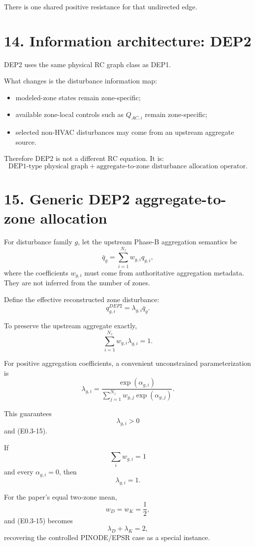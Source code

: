 \documentclass[11pt]{article}
\begin{document}
There is one shared positive resistance for that undirected edge.

\section*{14. Information architecture: DEP2}

DEP2 uses the same physical RC graph class as DEP1.

What changes is the disturbance information map:
\begin{itemize}
    \item modeled-zone states remain zone-specific;
    \item available zone-local controls such as $Q_{AC,i}$ remain zone-specific;
    \item selected non-HVAC disturbances may come from an upstream aggregate
          source.
\end{itemize}

Therefore DEP2 is not a different RC equation.  It is:
\[
\boxed{
\text{DEP1-type physical graph}
+
\text{aggregate-to-zone disturbance allocation operator}.
}
\]

\section*{15. Generic DEP2 aggregate-to-zone allocation}

For disturbance family $g$, let the upstream Phase-B aggregation semantics be
\[
\boxed{
\bar q_g
=
\sum_{i=1}^{N_z} w_{g,i} q_{g,i},
}
\tag{E0.3-13}
\]
where the coefficients $w_{g,i}$ must come from authoritative aggregation
metadata.  They are not inferred from the number of zones.

Define the effective reconstructed zone disturbance:
\[
\boxed{
q_{g,i}^{DEP2}
=
\lambda_{g,i}\bar q_g.
}
\tag{E0.3-14}
\]

To preserve the upstream aggregate exactly,
\[
\boxed{
\sum_{i=1}^{N_z}
w_{g,i}\lambda_{g,i}
=
1.
}
\tag{E0.3-15}
\]

For positive aggregation coefficients, a convenient unconstrained
parameterization is
\[
\boxed{
\lambda_{g,i}
=
\frac{\exp(\alpha_{g,i})}
{\sum_{j=1}^{N_z} w_{g,j}\exp(\alpha_{g,j})}.
}
\tag{E0.3-16}
\]

This guarantees
\[
\lambda_{g,i}>0
\]
and (E0.3-15).

If
\[
\sum_i w_{g,i}=1
\]
and every $\alpha_{g,i}=0$, then
\[
\lambda_{g,i}=1.
\]

For the paper's equal two-zone mean,
\[
w_D=w_K=\frac12,
\]
and (E0.3-15) becomes
\[
\lambda_D+\lambda_K=2,
\]
recovering the controlled PINODE/EPSR case as a special instance.
\end{document}
